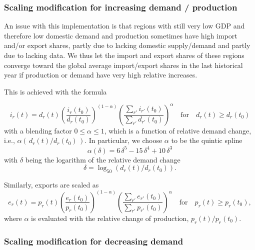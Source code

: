 \subsubsection{Scaling modification for increasing demand / production}

An issue with this implementation is that regions with still very low GDP and therefore low domestic demand and production sometimes have high import and/or export shares, partly due to lacking domestic supply/demand and partly due to lacking data. We thus let the import and export shares of these regions converge toward the global average import/export shares in the last historical year if production or demand have very high relative increases.

This is achieved with the formula

\begin{equation} \label{eq:import_scaling_incr}
    i_r(t) = d_r(t) \left(\frac{i_r(t_{0})}{d_r(t_{0})}\right)^{(1-\alpha)} \left(\frac{\sum_{r'} i_{r'}(t_{0})}{\sum_{r'} d_{r'}(t_{0})}\right)^{\alpha} \quad\text{for}\quad d_r(t) \geq d_r(t_{0})
\end{equation}
with a blending factor $0\leq\alpha\leq1$, which is a function of relative demand change, i.e., $\alpha(\,d_r(t)/d_r(t_{0})\,)$. In particular, we choose \( \alpha \) to be the quintic spline
\begin{equation}
    \alpha(\delta) = 6\, \delta^5 - 15 \, \delta^4 + 10 \, \delta^3
\end{equation}
with $\delta$ being the logarithm of the relative demand change
\begin{equation}
\delta = \log_{50}(d_r(t)/d_r(t_{0})).
\end{equation}

Similarly, exports are scaled as
\begin{equation} \label{eq:export_scaling_incr}
    e_r(t) = p_r(t) \left(\frac{e_r(t_{0})}{p_r(t_{0})}\right)^{(1-\alpha)} \left(\frac{\sum_{r'} e_{r'}(t_{0})}{\sum_{r'} p_{r'}(t_{0})}\right)^{\alpha} \quad\text{for}\quad p_r(t) \geq p_r(t_{0}),
\end{equation}
where $\alpha$ is evaluated with the relative change of production, $p_r(t)/p_r(t_{0})$.

\subsubsection{Scaling modification for decreasing demand}


